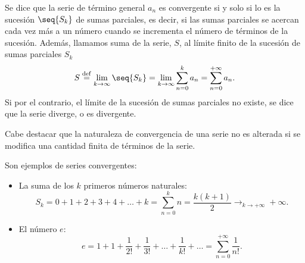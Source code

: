 \begin{defi}
    Se dice que la serie de término general $a_n$  es convergente si y solo si
    lo es la sucesión $\seq{S_k}$ de sumas parciales, es decir, si las sumas parciales se acercan cada vez más a un número cuando se incrementa el número de términos de la sucesión. Además, llamamos suma de la serie, $S$, al límite finito de la sucesión de sumas parciales $S_k$
    \begin{equation}
        S \overset{\mathrm{def}}{=} \lim_{k\to\infty}\seq{S_k} = \lim_{k\to\infty}\sum_{n = 0}^k a_n = \sum_{n = 0}^{+\infty}a_n.
    \end{equation}
    Si por el contrario, el límite de la sucesión de sumas parciales no existe, se dice que la serie diverge, o es divergente.
\end{defi}

Cabe destacar que la naturaleza de convergencia de una serie no es alterada si se modifica una cantidad finita de términos de la serie.

\begin{example}
    Son ejemplos de series convergentes:
    \begin{itemize}
        \item La suma de los $k$ primeros números naturales:
            \begin{equation}
                S_k = 0 + 1 + 2 + 3 + 4 + \ldots + k = \sum_{n=0}^k n = \frac{k\left( k + 1 \right) }{2} \longrightarrow_{k\to +\infty} +\infty.
            \end{equation}
        \item El número $e$:
            \begin{equation}
                e = 1 + 1 + \frac{1}{2!} + \frac{1}{3!} + \ldots + \frac{1}{k!} + \ldots = \sum_{n=0}^{+\infty}\frac{1}{n!}.
            \end{equation}

    \end{itemize}

\end{example}



